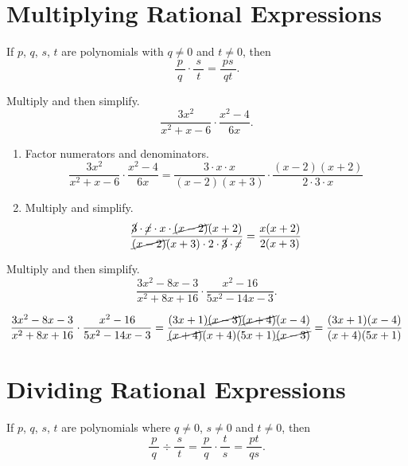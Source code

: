 \documentclass[en,12pt]{elegantbook}
\let\BeginKnitrBlock\begin \let\EndKnitrBlock\end
\begin{document}
\hypertarget{multiplying-rational-expressions}{%
\section{Multiplying Rational Expressions}\label{multiplying-rational-expressions}}

If \(p\), \(q\), \(s\), \(t\) are polynomials with \(q\neq 0\) and \(t\neq 0\), then
\[
\dfrac{~p~}{~q~}\cdot\dfrac{~s~}{~t~}=\dfrac{~ps~}{~qt~}.
\]

\BeginKnitrBlock{example}
\protect\hypertarget{exm:unnamed-chunk-36}{}{\label{exm:unnamed-chunk-36} }
Multiply and then simplify.
\[\dfrac{3x^2}{x^2+x-6}\cdot\dfrac{x^2-4}{6x}.\]
\EndKnitrBlock{example}

\BeginKnitrBlock{solution}


\begin{enumerate}
\def\labelenumi{\arabic{enumi}.}
\item
  Factor numerators and denominators.
  \[
   \dfrac{3x^2}{x^2+x-6}\cdot\dfrac{x^2-4}{6x}=\dfrac{3\cdot x\cdot x}{(x-2)(x+3)}\cdot\dfrac{(x-2)(x+2)}{2\cdot3\cdot x}
  \]
\item
  Multiply and simplify.
  \[
   \dfrac{\cancel{3}\cdot \cancel{x}\cdot x\cdot\cancel{(x-2)}(x+2)}{\cancel{(x-2)}(x+3)\cdot 2\cdot\cancel{3}\cdot \cancel{x}}=\dfrac{x(x+2)}{2(x+3)}
  \]
\end{enumerate}
\EndKnitrBlock{solution}

\BeginKnitrBlock{example}
\protect\hypertarget{exm:unnamed-chunk-38}{}{\label{exm:unnamed-chunk-38} }
Multiply and then simplify.
\[
\dfrac{3x^2-8x-3}{x^2+8x+16}\cdot\dfrac{x^2-16}{5x^2-14x-3}.
\]
\EndKnitrBlock{example}

\BeginKnitrBlock{solution}


\[
\dfrac{3x^2-8x-3}{x^2+8x+16}\cdot\dfrac{x^2-16}{5x^2-14x-3}
=\dfrac{(3x+1)\cancel{(x-3)}\cancel{(x+4)}(x-4)}{\cancel{(x+4)}(x+4)(5x+1)\cancel{(x-3)}}
=\dfrac{(3x+1)(x-4)}{(x+4)(5x+1)}
\]
\EndKnitrBlock{solution}

\hypertarget{dividing-rational-expressions}{%
\section{Dividing Rational Expressions}\label{dividing-rational-expressions}}

If \(p\), \(q\), \(s\), \(t\) are polynomials where \(q\neq 0\), \(s\neq 0\) and \(t\neq 0\), then
\[
\dfrac{~p~}{~q~}\div\dfrac{~s~}{~t~}=\dfrac{~p~}{~q~}\cdot\dfrac{~t~}{~s~}=\dfrac{~pt~}{~qs~}.
\]
\end{document}
